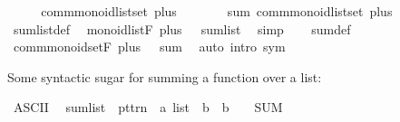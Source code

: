 \begin{isabellebody}
%
\isadelimproof
%
\endisadelimproof
%
\isatagproof
{}\isamarkupfalse%
\ {\isacharminus}{\kern0pt}\isanewline
\ \ \isamarkupfalse%
\ {\isachardoublequoteopen}comm{\isacharunderscore}{\kern0pt}monoid{\isacharunderscore}{\kern0pt}list{\isacharunderscore}{\kern0pt}set\ plus\ {}{\isachardoublequoteclose}\ \isacommand{{\isachardot}{\kern0pt}{\isachardot}{\kern0pt}}\isamarkupfalse%
\isanewline
\ \ \isamarkupfalse%
\ \isamarkupfalse%
\ sum{\isacharcolon}{\kern0pt}\ comm{\isacharunderscore}{\kern0pt}monoid{\isacharunderscore}{\kern0pt}list{\isacharunderscore}{\kern0pt}set\ plus\ {}\ \isacommand{{\isachardot}{\kern0pt}}\isamarkupfalse%
\isanewline
\ \ \isamarkupfalse%
\ sum{\isacharunderscore}{\kern0pt}list{\isacharunderscore}{\kern0pt}def\ \isamarkupfalse%
\ {\isachardoublequoteopen}monoid{\isacharunderscore}{\kern0pt}list{\isachardot}{\kern0pt}F\ plus\ {}\ {\isacharequal}{\kern0pt}\ sum{\isacharunderscore}{\kern0pt}list{\isachardoublequoteclose}\ \isamarkupfalse%
\ simp\isanewline
\ \ \isamarkupfalse%
\ sum{\isacharunderscore}{\kern0pt}def\ \isamarkupfalse%
\ {\isachardoublequoteopen}comm{\isacharunderscore}{\kern0pt}monoid{\isacharunderscore}{\kern0pt}set{\isachardot}{\kern0pt}F\ plus\ {}\ {\isacharequal}{\kern0pt}\ sum{\isachardoublequoteclose}\ \isamarkupfalse%
\ {\isacharparenleft}{\kern0pt}auto\ intro{\isacharcolon}{\kern0pt}\ sym{\isacharparenright}{\kern0pt}\isanewline
{}\isamarkupfalse%
%
\endisatagproof
{\isafoldproof}%
%
\isadelimproof
\isanewline
%
\endisadelimproof
\isanewline
{}\isamarkupfalse%
%
\begin{isamarkuptext}%
Some syntactic sugar for summing a function over a list:%
\end{isamarkuptext}\isamarkuptrue%
\isamarkupfalse%
\ {\isacharparenleft}{\kern0pt}ASCII{\isacharparenright}{\kern0pt}\isanewline
\ \ {\isachardoublequoteopen}{\isacharunderscore}{\kern0pt}sum{\isacharunderscore}{\kern0pt}list{\isachardoublequoteclose}\ {\isacharcolon}{\kern0pt}{\isacharcolon}{\kern0pt}\ {\isachardoublequoteopen}pttrn\ {\isacharequal}{\kern0pt}{\isachargreater}{\kern0pt}\ {\isacharprime}{\kern0pt}a\ list\ {\isacharequal}{\kern0pt}{\isachargreater}{\kern0pt}\ {\isacharprime}{\kern0pt}b\ {\isacharequal}{\kern0pt}{\isachargreater}{\kern0pt}\ {\isacharprime}{\kern0pt}b{\isachardoublequoteclose}\ \ \ \ {\isacharparenleft}{\kern0pt}{\isachardoublequoteopen}{\isacharparenleft}{\kern0pt}{}SUM\ {\isacharunderscore}{\kern0pt}{\isacharless}{\kern0pt}{\isacharminus}{\kern0pt}{\isacharunderscore}{\kern0pt}{\isachardot}{\kern0pt}\ {\isacharunderscore}{\kern0pt}{\isacharparenright}{\kern0pt}{\isachardoublequoteclose}\ {\isacharbrackleft}{\kern0pt}{}{\isacharcomma}{\kern0pt}\ {}{}{\isacharcomma}{\kern0pt}\ {}{}{\isacharbrackright}{\kern0pt}\ {}{}{\isacharparenright}{\kern0pt}\isanewline

\end{isabellebody}
